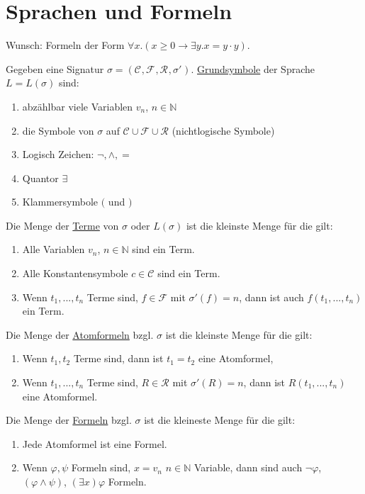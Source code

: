 \documentclass{article}
\theoremstyle{definition}
\theoremstyle{plain}
\newcommand{\m}[1]{\mathcal{#1}}
\newcommand{\sign}[1]{(\m{C}_{#1}, \m{F}_{#1}, \m{R}_{#1}, \sigma'_{#1})}
\begin{document}
    \section{Sprachen und Formeln}

    Wunsch: Formeln der Form $ \forall x. (x \geq 0 \rightarrow \exists y. x = y \cdot y) $.

    Gegeben eine Signatur $ \sigma = \sign{} $.
    \underline{Grundsymbole} der Sprache $ L = L(\sigma) $ sind:
    \begin{enumerate}
        \item abzählbar viele Variablen $ v_n $, $ n \in \mathbb{N} $
        \item die Symbole von $ \sigma $ auf $ \m{C} \cup \m{F} \cup \m{R} $ (nichtlogische Symbole)
        \item Logisch Zeichen: $ \neg, \land, = $
        \item Quantor $ \exists $
        \item Klammersymbole $ ( $ und $ ) $
    \end{enumerate}

    Die Menge der \underline{Terme} von $ \sigma $ oder $ L(\sigma) $ ist die kleinste Menge für die gilt:
    \begin{enumerate}
        \item Alle Variablen $ v_n $, $ n \in \mathbb{N} $ sind ein Term.
        \item Alle Konstantensymbole $ c \in \m{C} $ sind ein Term.
        \item Wenn $ t_1, ..., t_n $ Terme sind, $ f \in \m{F} $ mit $ \sigma'(f) = n $, dann ist auch $ f(t_1, ..., t_n) $ ein Term.
    \end{enumerate}

    Die Menge der \underline{Atomformeln} bzgl. $ \sigma $ ist die kleinste Menge für die gilt:
    \begin{enumerate}
        \item Wenn $ t_1, t_2 $ Terme sind, dann ist $ t_1 = t_2 $ eine Atomformel,
        \item Wenn $ t_1, ..., t_n $ Terme sind, $ R \in \m{R} $ mit $ \sigma'(R) = n $, dann ist $ R(t_1, ..., t_n) $ eine Atomformel.
    \end{enumerate}

    Die Menge der \underline{Formeln} bzgl. $\sigma $ ist die kleineste Menge für die gilt:
    \begin{enumerate}
        \item Jede Atomformel ist eine Formel.
        \item Wenn $ \varphi, \psi $ Formeln sind, $ x = v_n $ $ n \in \mathbb{N} $ Variable, dann sind auch $ \neg \varphi$, $ (\varphi \land \psi) $, $ (\exists x) \varphi $ Formeln.
    \end{enumerate}
\end{document}
